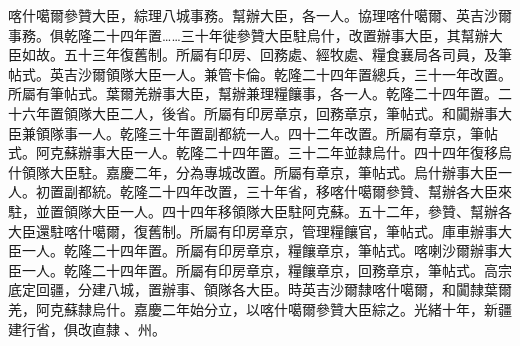 \begin{pinyinscope}
喀什噶爾參贊大臣，綜理八城事務。幫辦大臣，各一人。協理喀什噶爾、英吉沙爾事務。俱乾隆二十四年置……三十年徙參贊大臣駐烏什，改置辦事大臣，其幫辦大臣如故。五十三年復舊制。所屬有印房、回務處、經牧處、糧食襄局各司員，及筆帖式。英吉沙爾領隊大臣一人。兼管卡倫。乾隆二十四年置總兵，三十一年改置。所屬有筆帖式。葉爾羌辦事大臣，幫辦兼理糧饟事，各一人。乾隆二十四年置。二十六年置領隊大臣二人，後省。所屬有印房章京，回務章京，筆帖式。和闐辦事大臣兼領隊事一人。乾隆三十年置副都統一人。四十二年改置。所屬有章京，筆帖式。阿克蘇辦事大臣一人。乾隆二十四年置。三十二年並隸烏什。四十四年復移烏什領隊大臣駐。嘉慶二年，分為專城改置。所屬有章京，筆帖式。烏什辦事大臣一人。初置副都統。乾隆二十四年改置，三十年省，移喀什噶爾參贊、幫辦各大臣來駐，並置領隊大臣一人。四十四年移領隊大臣駐阿克蘇。五十二年，參贊、幫辦各大臣還駐喀什噶爾，復舊制。所屬有印房章京，管理糧饟官，筆帖式。庫車辦事大臣一人。乾隆二十四年置。所屬有印房章京，糧饟章京，筆帖式。喀喇沙爾辦事大臣一人。乾隆二十四年置。所屬有印房章京，糧饟章京，回務章京，筆帖式。高宗底定回疆，分建八城，置辦事、領隊各大臣。時英吉沙爾隸喀什噶爾，和闐隸葉爾羌，阿克蘇隸烏什。嘉慶二年始分立，以喀什噶爾參贊大臣綜之。光緒十年，新疆建行省，俱改直隸、州。


\end{pinyinscope}
